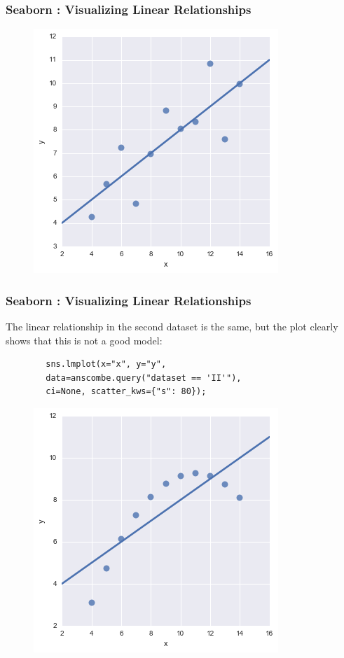 \documentclass{beamer}
\begin{document}
\begin{frame}[fragile]
	\frametitle{Seaborn : Visualizing Linear Relationships}
	\large	
	\begin{figure}
		\centering
		\includegraphics[width=0.7\linewidth]{images/regression_19_0}
	\end{figure}
	
\end{frame}

\begin{frame}[fragile]
	\frametitle{Seaborn : Visualizing Linear Relationships}
	\large	
	The linear relationship in the second dataset is the same, but the plot clearly shows that this is not a good model:
	\begin{framed}
		\begin{verbatim}
		sns.lmplot(x="x", y="y", 
		data=anscombe.query("dataset == 'II'"),
		ci=None, scatter_kws={"s": 80});
		\end{verbatim}
	\end{framed}
	\begin{figure}
		\centering
		\includegraphics[width=0.7\linewidth]{images/regression_21_0}
	\end{figure}
	
	
\end{frame}
\end{document}
